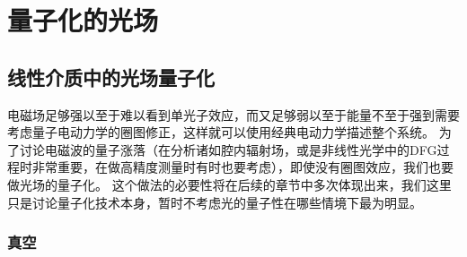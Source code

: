 \chapter{量子化的光场}

\section{线性介质中的光场量子化}

电磁场足够强以至于难以看到单光子效应，而又足够弱以至于能量不至于强到需要考虑量子电动力学的圈图修正，这样就可以使用经典电动力学描述整个系统。
为了讨论电磁波的量子涨落（在分析诸如腔内辐射场，或是非线性光学中的DFG过程时非常重要，在做高精度测量时有时也要考虑），即使没有圈图效应，我们也要做光场的量子化。
这个做法的必要性将在后续的章节中多次体现出来，我们这里只是讨论量子化技术本身，暂时不考虑光的量子性在哪些情境下最为明显。

\subsection{真空}\label{sec:quantization-in-vacuum}

